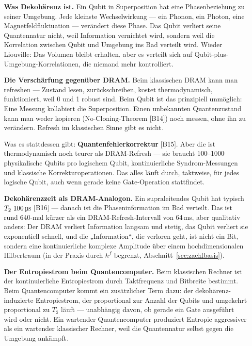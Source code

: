 \textbf{Was Dekohärenz ist.} Ein Qubit in Superposition hat eine Phasenbeziehung
zu seiner Umgebung. Jede kleinste Wechselwirkung --- ein Phonon, ein Photon, eine
Magnetfeldfluktuation --- verändert diese Phase. Das Qubit verliert seine
Quantennatur nicht, weil Information vernichtet wird, sondern weil die Korrelation
zwischen Qubit und Umgebung ins Bad verteilt wird. Wieder Liouville: Das Volumen
bleibt erhalten, aber es verteilt sich auf Qubit-plus-Umgebung-Korrelationen, die
niemand mehr kontrolliert.

\textbf{Die Verschärfung gegenüber DRAM.} Beim klassischen DRAM kann man
refreshen --- Zustand lesen, zurückschreiben, kostet thermodynamisch,
funktioniert, weil 0 und 1 robust sind. Beim Qubit ist das prinzipiell unmöglich:
Eine Messung kollabiert die Superposition. Einen unbekannten Quantenzustand kann
man weder kopieren (No-Cloning-Theorem [B14]) noch messen, ohne ihn zu verändern.
Refresh im klassischen Sinne gibt es nicht.

Was es stattdessen gibt: \textbf{Quantenfehlerkorrektur} [B15]. Aber die ist
thermodynamisch noch teurer als DRAM-Refresh --- sie braucht 100--1000
physikalische Qubits pro logischem Qubit, kontinuierliche Syndrom-Messungen und
klassische Korrekturoperationen. Das alles läuft durch, taktweise, für jedes
logische Qubit, auch wenn gerade keine Gate-Operation stattfindet.

\LK \textbf{Dekohärenzzeit als DRAM-Analogon.} Ein supraleitendes Qubit hat
typisch $T_2 \sim 100\,\text{\textmu s}$ [B16] --- danach ist die
Phaseninformation im Bad verteilt. Das ist rund 640-mal kürzer als ein
DRAM-Refresh-Intervall von 64\,ms, aber qualitativ anders: Der DRAM verliert
Information langsam und stetig, das Qubit verliert sie exponentiell schnell, und
die „Information“, die verloren geht, ist nicht ein Bit, sondern eine
kontinuierliche komplexe Amplitude über einem hochdimensionalen Hilbertraum (in
der Praxis durch $h^f$ begrenzt, Abschnitt~\ref{sec:zaehlbasis}).

\textbf{Der Entropiestrom beim Quantencomputer.} Beim klassischen Rechner ist der
kontinuierliche Entropiestrom durch Taktfrequenz und Bitbreite bestimmt. Beim
Quantencomputer kommt ein zusätzlicher Term dazu: der dekohärenz-induzierte
Entropiestrom, der proportional zur Anzahl der Qubits und umgekehrt proportional
zu $T_2$ läuft --- unabhängig davon, ob gerade ein Gate ausgeführt wird oder
nicht. Ein wartender Quantencomputer produziert Entropie aggressiver als ein
wartender klassischer Rechner, weil die Quantennatur selbst gegen die Umgebung
ankämpft.

